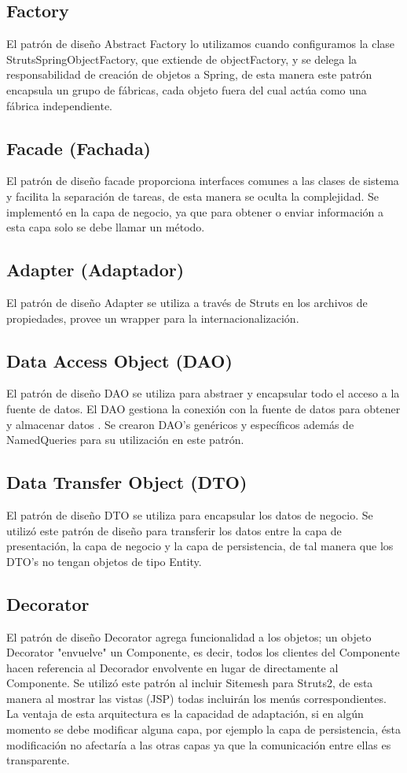 \subsection{Factory}
El patrón de diseño Abstract Factory lo utilizamos cuando configuramos la clase StrutsSpringObjectFactory, que extiende de objectFactory, y se delega la responsabilidad de creación de objetos a Spring, de esta manera este patrón encapsula un grupo de fábricas, cada objeto fuera del cual actúa como una fábrica independiente.

\subsection{Facade (Fachada)}
El patrón de diseño facade proporciona interfaces comunes a las clases de sistema y facilita la separación de tareas, de esta manera se oculta la complejidad. Se implementó en la capa de negocio, ya que para obtener o enviar información a esta capa solo se debe llamar un método. 

\subsection{Adapter (Adaptador)}
El patrón de diseño Adapter se utiliza a través de Struts en los archivos de propiedades, provee un wrapper para la internacionalización.

\subsection{Data Access Object (DAO)}
El patrón de diseño DAO se utiliza para abstraer y encapsular todo el acceso a la fuente de datos. El DAO gestiona la conexión con la fuente de datos para obtener y almacenar datos . Se crearon DAO’s genéricos y específicos además de NamedQueries para su utilización en este patrón.

\subsection{Data Transfer Object (DTO)}
El patrón de diseño DTO se utiliza para encapsular los datos de negocio. Se utilizó este patrón de diseño para transferir los datos entre la capa de presentación, la capa de negocio y la capa de persistencia, de tal manera que los DTO’s no tengan objetos de tipo Entity.

\subsection{Decorator}
El patrón de diseño Decorator agrega funcionalidad a los objetos; un objeto Decorator "envuelve" un Componente, es decir, todos los clientes del Componente hacen referencia al Decorador envolvente en lugar de directamente al Componente. Se utilizó este patrón al incluir Sitemesh para Struts2, de esta manera al mostrar las vistas (JSP) todas incluirán los menús correspondientes.\\

La ventaja de esta arquitectura es la capacidad de adaptación, si en algún momento se debe modificar alguna capa, por ejemplo la capa de persistencia, ésta modificación no afectaría a las otras capas ya que la comunicación entre ellas es transparente.
